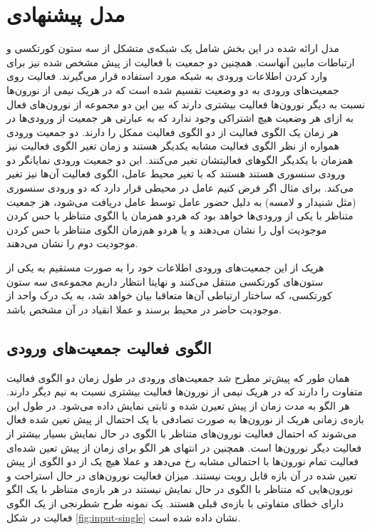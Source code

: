 \documentclass[12pt]{report}
\begin{document}
	\section{مدل پیشنهادی}
	
	مدل ارائه شده در این بخش شامل یک شبکه‌ی متشکل از سه ستون کورتکسی و ارتباطات مابین آنهاست. همچنین دو جمعیت با فعالیت از پیش مشخص شده نیز برای وارد کردن اطلاعات ورودی به شبکه مورد استفاده قرار می‌گیرند. فعالیت روی جمعیت‌های ورودی به دو وضعیت تقسیم شده است که در هریک نیمی از نورون‌ها نسبت به دیگر نورون‌ها فعالیت بیشتری دارند که بین این دو مجموعه از نورون‌های فعال به ازای هر وضعیت هیچ اشتراکی وجود ندارد که به عبارتی هر جمعیت از ورودی‌ها در هر زمان یک الگوی فعالیت از دو الگوی فعالیت ممکل را دارند. دو جمعیت ورودی همواره از نظر الگوی فعالیت مشابه یکدیگر هستند و زمان تغیر الگوی فعالیت نیز همزمان با یکدیگر الگو‌های فعالیتشان تغیر می‌کنند. این دو جمعیت ورودی نمایانگر دو ورودی سنسوری هستند هستند که با تغیر محیط عامل، الگوی فعالیت آن‌ها نیز تغیر می‌کند. برای مثال اگر فرض کنیم عامل در محیطی قرار دارد که دو ورودی سنسوری (مثل شنیدار و لامسه) به دلیل حضور عامل توسط عامل دریافت می‌شود، هز جمعیت متناظر با یکی از ورودی‌ها خواهد بود که هردو همزمان یا الگوی متناظر با حس کردن موجودیت اول را نشان‌ می‌دهند و یا هردو هم‌زمان الگوی متناظر با حس کردن موجودیت دوم را نشان می‌دهند.
	
	هریک از این جمعیت‌های ورودی اطلاعات خود‌ را به صورت مستقیم به یکی از ستون‌های کورتکسی منتقل می‌کنند و نهایتا انتظار داریم مجموعه‌ی سه ستون کورتکسی، که ساختار ارتباطی آن‌ها متعاقبا بیان خواهد شد، به یک درک واحد از موجودیت حاضر در محیط برسند و عملا انقیاد در آن مشخص باشد.
	
	
	\subsection{الگوی فعالیت جمعیت‌های ورودی}
	
	همان طور که پیش‌تر مطرح شد جمعیت‌های ورودی در طول زمان دو الگوی فعالیت متفاوت را دارند که در هر‌یک نیمی از نورون‌ها فعالیت بیشتری نسبت به نیم دیگر دارند. هر الگو به مدت زمان از پیش تعیرن شده و ثابتی نمایش داده می‌شود. در طول این بازه‌ی زمانی هریک از نورون‌ها به صورت تصادفی با یک احتمال از پیش تعین شده فعال می‌شوند که احتمال فعالیت نورون‌های متناظر با الگوی در حال نمایش بسیار بیشتر از فعالیت دیگر نورون‌ها است. همچنین در انتهای هر الگو برای زمان از پیش تعین شده‌ای فعالیت تمام نورون‌ها با احتمالی مشابه رخ می‌دهد  و عملا هیچ یک از دو الگوی از پیش تعین شده در آن بازه قابل رویت نیستند. میزان فعالیت نورون‌های در حال استراحت و نورون‌هایی که متناظر با الگوی در حال نمایش نیستند در هر بازه‌ی متناظر با یک الگو دارای خطای متفاوتی با بازه‌ی قبلی هستند. یک نمونه طرح شطرنجی از یک الگوی فعالیت در شکل \ref{fig:input-single} نشان داده شده است.
	
\end{document}
